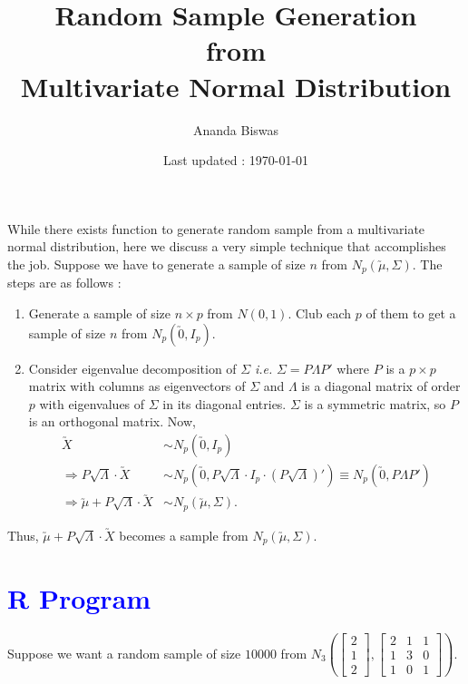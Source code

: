 \documentclass[11pt, a4paper]{article}\usepackage[]{graphicx}\usepackage[]{xcolor}
\title{Random Sample Generation \\[0.1em] from \\[0.1em] Multivariate Normal Distribution}
\author{{\fontsize{22}{20} \benyorithafont Ananda Biswas}}
\date{Last updated : \today}
\begin{document}
\maketitle

While there exists function to generate random sample from a multivariate normal distribution, here we discuss a very simple technique that accomplishes the job. Suppose we have to generate a sample of size $n$ from $N_p\left( \utilde{\mu}, \Sigma \right)$. The steps are as follows :

\begin{enumerate}[Step I.]
\item Generate a sample of size $n \times p$ from $N(0, 1)$. Club each $p$ of them to get a sample of size $n$ from $N_p\left( \utilde{0}, I_{p}\right)$.

\item Consider eigenvalue decomposition of $\Sigma$ \textit{i.e.} $\Sigma = P\Lambda P'$ where $P$ is a $p \times p$ matrix with columns as eigenvectors of $\Sigma$ and $\Lambda$ is a diagonal matrix of order $p$ with eigenvalues of $\Sigma$ in its diagonal entries. $\Sigma$ is a symmetric matrix, so $P$ is an orthogonal matrix. Now,
\begin{align*}
\utilde{X} &\sim N_p\left( \utilde{0}, I_{p} \right) \\[0.2em]
\Rightarrow P \sqrt{\Lambda} \cdot \utilde{X} &\sim N_p\left( \utilde{0}, P \sqrt{\Lambda} \cdot I_{p} \cdot \left(P \sqrt{\Lambda} \right)' \right) \equiv N_p\left( \utilde{0}, P \Lambda P'\right) \\[0.2em]
\Rightarrow \utilde{\mu} + P \sqrt{\Lambda} \cdot \utilde{X} &\sim N_p\left( \utilde{\mu}, \Sigma \right).
\end{align*}

\end{enumerate}

Thus, $\utilde{\mu} + P \sqrt{\Lambda} \cdot \utilde{X}$ becomes a sample from $N_p\left( \utilde{\mu}, \Sigma \right)$.

\section*{\faArrowAltCircleRight[regular] \textcolor{blue}{R Program}}

Suppose we want a random sample of size $10000$ from $N_3 \left( \begin{bmatrix} 2 \\ 1 \\ 2 \end{bmatrix}, \begin{bmatrix} 2 & 1 & 1 \\ 1 & 3 & 0 \\ 1 & 0 & 1 \end{bmatrix} \right)$.
\end{document}

